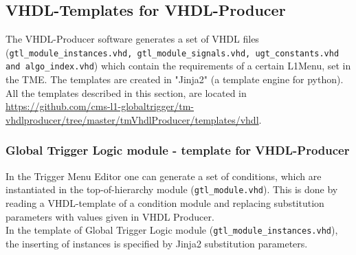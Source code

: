 \clearpage

\subsection{VHDL-Templates for VHDL-Producer}
\label{sec:gtl:templates_tme}

The VHDL-Producer software generates a set of VHDL files (\texttt{gtl\_module\_instances.vhd, gtl\_module\_signals.vhd, ugt\_constants.vhd and algo\_index.vhd}) which contain the requirements of a certain L1Menu, set in the TME. 
The templates are created in "Jinja2" (a template engine for python).
All the templates described in this section, are located in \url{https://github.com/cms-l1-globaltrigger/tm-vhdlproducer/tree/master/tmVhdlProducer/templates/vhdl}.

\subsubsection{Global Trigger Logic module - template for VHDL-Producer}
\label{sec:gtl:gtl_module_tme}
In the Trigger Menu Editor one can generate a set of conditions, which are instantiated in the top-of-hierarchy module (\texttt{gtl\_module.vhd}). This is done by reading a VHDL-template of a condition module and replacing substitution parameters with values given in VHDL Producer.\\
In the template of Global Trigger Logic module (\texttt{gtl\_module\_instances.vhd}), the inserting of instances is specified by Jinja2 substitution parameters.

